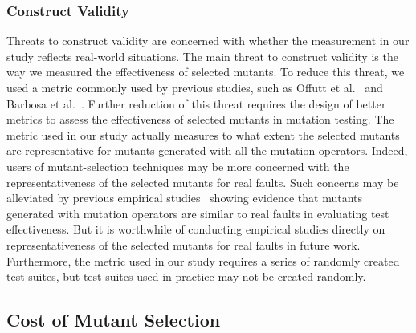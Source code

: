 \vspace{-1.5ex}
\subsubsection{Construct Validity}
\label{Construct}

Threats to construct validity are concerned with whether the
measurement in our study reflects real-world situations. The main
threat to construct validity is the way we measured the
effectiveness of selected mutants. To reduce this threat, we used a
metric commonly used by previous studies, such as Offutt et
al.~\cite{Offutt:96} and Barbosa et al.~\cite{Barbosa:01}. Further
reduction of this threat requires the design of better metrics to
assess the effectiveness of selected mutants in mutation testing.
The metric used in our study actually measures to what extent the
selected mutants are representative for mutants generated with all
the mutation operators. Indeed, users of mutant-selection techniques
may be more concerned with the representativeness of the selected
mutants for real faults. Such concerns may be alleviated by previous
empirical studies~\cite{Andrews:05,Do:06} showing evidence that mutants
generated with mutation operators are similar to real faults in
evaluating test effectiveness. But it is worthwhile of conducting
empirical studies directly on representativeness of the selected
mutants for real faults in future work.  Furthermore, the metric used in our
study requires a series of randomly created test suites, but test
suites used in practice may not be created randomly.

\vspace{-1.5ex}
\subsection{Cost of Mutant Selection}
\label{Cost}

